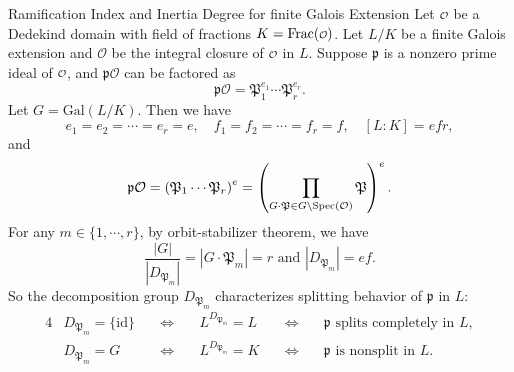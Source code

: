 \begin{proposition}{Ramification Index and Inertia Degree for finite Galois Extension}{}
    Let $\mathcalo$ be a Dedekind domain with field of fractions $K=\mathrm{Frac}(\mathcalo)$. Let $L/K$ be a finite Galois extension and $\mathcal{O}$ be the integral closure of $\mathcalo$ in $L$. Suppose $\mathfrak p$ is a nonzero prime ideal of $\mathcalo$, and $\mathfrak p\mathcal{O}$ can be factored as
    \[
    \mathfrak p\mathcal{O}=\mathfrak P_1^{e_1}\cdots\mathfrak P_r^{e_r}.
    \]
    Let $G=\mathrm{Gal}(L/K)$. 
    Then we have 
    \[
    e_1=e_2=\cdots=e_r=e, \quad
    f_1=f_2=\cdots=f_r=f,\quad [L:K]=efr,
    \]
    and
    \[
        \mathfrak p\mathcal{O} =\left(  \mathfrak P_1\cdots\mathfrak P_r\right)^e=\left( \prod_{G\cdot \mathfrak P\in G\backslash \!\operatorname{Spec}\left(\mathcal{O}\right)}\mathfrak P\right)^e.
    \]
    For any $m\in\{1,\cdots, r\}$, by orbit-stabilizer theorem, we have
    \[
    \frac{\left|G\right|}{\left|D_{\mathfrak{P}_m}\right|}=|G \cdot \mathfrak{P}_m|=r\text{ and }\left|D_{\mathfrak{P}_m}\right|=ef.
    \]
    So the decomposition group $D_{\mathfrak{P}_m}$ characterizes splitting behavior of $\mathfrak{p}$ in $L$:
    \begin{alignat*}{4}
        &D_{\mathfrak{P}_m} = \{\mathrm{id}\} \quad &\iff\quad & L^{D_{\mathfrak{P}_m}} = L \quad &\iff\quad & \mathfrak{p} \text{ splits completely in } L, \\
        &D_{\mathfrak{P}_m} = G              \quad &\iff\quad & L^{D_{\mathfrak{P}_m}} = K \quad &\iff\quad & \mathfrak{p} \text{ is nonsplit in } L.
    \end{alignat*}
\end{proposition}
